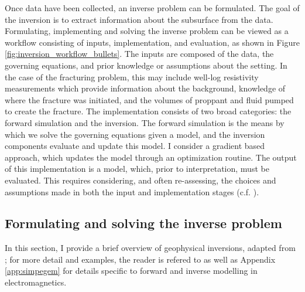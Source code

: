 Once data have been collected, an inverse problem can be formulated. The goal of the inversion is to extract information about the subsurface from the data. Formulating, implementing and solving the inverse problem can be viewed as a workflow consisting of inputs, implementation, and evaluation, as shown in Figure \ref{fig:inversion_workflow_bullets}. The inputs are composed of the data, the governing equations, and prior knowledge or assumptions about the setting. In the case of the fracturing problem, this may include well-log resistivity measurements which provide information about the background, knowledge of where the fracture was initiated, and the volumes of proppant and fluid pumped to create the fracture.
The implementation consists of two broad categories: the forward simulation and the inversion. The forward simulation is the means by which we solve the governing equations given a model, and the inversion components evaluate and update this model. I consider a gradient based approach, which updates the model through an optimization routine. The output of this implementation is a model, which, prior to interpretation, must be evaluated. This requires considering, and often re-assessing, the choices and assumptions made in both the input and implementation stages (c.f. \cite{Oldenburg2005, Haber2014a, Cockett2015}).



\subsection{Formulating and solving the inverse problem}
In this section, I provide a brief overview of geophysical inversions, adapted from \cite{Cockett2015}; for more detail and examples, the reader is refered to \cite{Oldenburg2005, Cockett2015} as well as Appendix \ref{app:simpegem} for details specific to forward and inverse modelling in electromagnetics.

